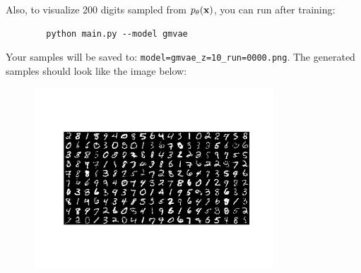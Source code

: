 \begin{enumerate}[label=(\alph*)]
    Also, to visualize 200 digits sampled from $p_{\theta}(\mathbf{x})$, you can run after training: 
    \begin{verbatim}
        python main.py --model gmvae
    \end{verbatim}
    
    Your samples will be saved to: \texttt{model=gmvae\_z=10\_run=0000.png}. The generated samples should look like the image below:

    \begin{figure}[h]
        \centering
        \includegraphics[width=0.8\textwidth]{./figures/gmvae_gen}
    \end{figure}

\end{enumerate}